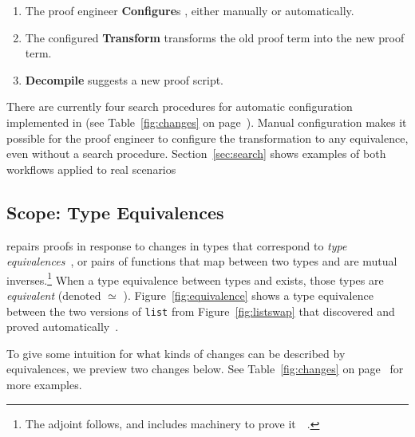 \begin{enumerate}
\item The proof engineer \textbf{Configure}s \toolnamec, either manually or automatically.
\item The configured \textbf{Transform} transforms the old proof term into the new proof term.
\item \textbf{Decompile} suggests a new proof script. %
\end{enumerate}
There are currently four search procedures for automatic configuration implemented in \toolnamec (see Table~\ref{fig:changes} on page~\pageref{fig:changes}).
Manual configuration makes it possible
for the proof engineer to configure the transformation to any equivalence,
even without a search procedure.
Section~\ref{sec:search} shows examples of both workflows applied to real scenarios

\subsection{Scope: Type Equivalences}
\label{sec:scope}

\toolnamec repairs proofs in response to changes in types that correspond to \textit{type equivalences}~\cite{univalent2013homotopy},
or pairs of functions that map between two types and are mutual inverses.\footnote{The adjoint follows, and \toolnamec includes machinery to prove it~\href{https://github.com/uwplse/pumpkin-pi/blob/v2.0.0/plugin/src/automation/search/equivalence.ml}{}~\href{https://github.com/uwplse/pumpkin-pi/blob/v2.0.0/plugin/theories/Adjoint.v}{}.}
When a type equivalence between types \Aa and \B exists, those types are \textit{equivalent} (denoted \Aa $\simeq$ \B). %
Figure~\ref{fig:equivalence} shows a type equivalence between the two versions of \lstinline{list}
from Figure~\ref{fig:listswap} that \toolnamec discovered and proved automatically~\href{https://github.com/uwplse/pumpkin-pi/blob/v2.0.0/plugin/coq/Swap.v}{}.

%

To give some intuition for what kinds of changes can be described by equivalences, we preview two changes below.
See Table~\ref{fig:changes} on page~\pageref{fig:changes} for more examples.

